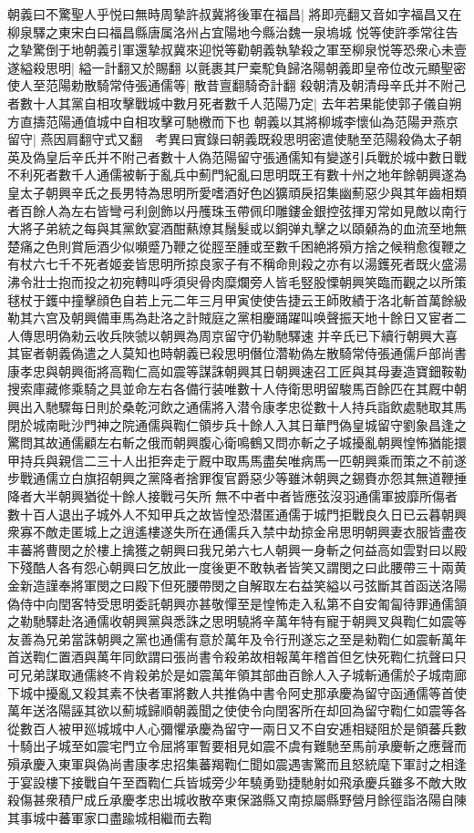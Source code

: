 朝義曰不驚聖人乎悦曰無時周摯許叔冀將後軍在福昌|{
	將即亮翻又音如字福昌又在柳泉驛之東宋白曰福昌縣唐属洛州占宜陽地今縣治魏一泉塢城}
悦等使許季常往告之摯驚倒于地朝義引軍還摯叔冀來迎悦等勸朝義執摯殺之軍至柳泉悦等恐衆心未壹遂縊殺思明|{
	縊一計翻又於賜翻}
以氈裹其尸槖駝負歸洛陽朝義即皇帝位改元顯聖密使人至范陽勅散騎常侍張通儒等|{
	散昔亶翻騎奇計翻}
殺朝清及朝清母辛氏并不附己者數十人其黨自相攻擊戰城中數月死者數千人范陽乃定|{
	去年若果能使郭子儀自朔方直擣范陽通值城中自相攻擊可馳檄而下也}
朝義以其將柳城李懷仙為范陽尹燕京留守|{
	燕因肩翻守式又翻　考異曰實錄曰朝義既殺思明密遣使馳至范陽殺偽太子朝英及偽皇后辛氏并不附己者數十人偽范陽留守張通儒知有變遂引兵戰於城中數日戰不利死者數千人通儒被斬于亂兵中薊門紀亂曰思明既王有數十州之地年餘朝興遂為皇太子朝興辛氏之長男特為思明所愛嗜酒好色凶獷頑戾招集幽薊惡少與其年齒相類者百餘人為左右皆彎弓利劍飾以丹雘珠玉帶佩印雕鏤金銀控弦揮刃常如見敵以南行大將子弟統之每與其黨飲宴酒酣爇燎其鬚髮或以銅弹丸擊之以頤顙為的血流至地無楚痛之色則賞巵酒少似嚬蹙乃鞭之從脛至腫或至數千困絶將殞方捨之候稍愈復鞭之有杖六七千不死者姬妾皆思明所掠良家子有不稱命則殺之亦有以湯鑊死者既火盛湯沸令壯士抱而投之初宛轉叫呼須臾骨肉糜爛旁人皆毛竪股慄朝興笑臨而觀之以所策毬杖于鑊中撞擊顔色自若上元二年三月甲寅使使告捷云王師敗績于洛北斬首萬餘級勒其六宫及朝興備車馬為赴洛之計賊庭之黨相慶踊躍叫唤聲振天地十餘日又宦者二人傳思明偽勑云收兵陜虢以朝興為周京留守仍勒馳驛速并辛氏已下續行朝興大喜其宦者朝義偽遣之人莫知也時朝義已殺思明僭位濳勒偽左散騎常侍張通儒戶部尚書康孝忠與朝興衙將高鞫仁高如震等謀誅朝興其日朝興速召工匠與其母妻造寶鈿鞍勒搜索庫藏修乘騎之具並命左右各備行装唯數十人侍衛思明留駿馬百餘匹在其厩中朝興出入馳驟每日則於桑乾河飲之通儒將入潜令康孝忠從數十人持兵詣飲處馳取其馬閉於城南毗沙門神之院通儒與鞫仁領步兵十餘人入其日華門偽皇城留守劉象昌逢之驚問其故通儒顧左右斬之俄而朝興腹心衛鳴鶴又問亦斬之子城擾亂朝興惶怖猶能擐甲持兵與親信二三十人出拒奔走亍厩中取馬馬盡矣唯病馬一匹朝興乘而策之不前遂步戰通儒立白旗招朝興之黨降者捨罪復官爵惡少等雖沐朝興之錫賚亦怨其無道鞭捶降者大半朝興猶從十餘人接戰弓矢所無不中者中者皆應弦沒羽通儒軍披靡所傷者數十百人退出子城外人不知甲兵之故皆惶恐潜匿通儒于城門拒戰良久日已云暮朝興衆寡不敵走匿城上之逍遙樓遂失所在通儒兵入禁中劫掠金帛思明朝興妻衣服皆盡夜丰蕃將曹閔之於樓上擒獲之朝興曰我兄弟六七人朝興一身斬之何益高如雲對曰以殿下殘酷人各有怨心朝興曰乞放此一度後更不敢執者皆笑又謂閔之曰此腰帶三十兩黄金新造謹奉將軍閔之曰殿下但死腰帶閔之自解取左右益笑縊以弓弦斷其首函送洛陽偽侍中向閏客特受思明委託朝興亦甚敬憚至是惶怖走入私第不自安匍匐待罪通儒頷之勒馳驛赴洛通儒收朝興黨與悉誅之思明驍將辛萬年特有寵于朝興叉與鞫仁如震等友善為兄弟當誅朝興之黨也通儒有意於萬年及令行刑遂忘之至是勑鞫仁如震斬萬年首送鞫仁置酒與萬年同飲謂曰張尚書令殺弟故相報萬年稽首但乞快死鞫仁抗聲曰只可兄弟謀取通儒終不肯殺弟於是如震萬年領其部曲百餘人入子城斬通儒於子城南廊下城中擾亂又殺其素不快者軍將數人共推偽中書令阿史那承慶為留守函通儒等首使萬年送洛陽誣其欲以薊城歸順朝義聞之使使令向閏客所在却回為留守鞫仁如震等各從數百人被甲廵城城中人心彌懼承慶為留守一兩日又不自安逓相疑阻於是領蕃兵數十騎出子城至如震宅門立令屈將軍暫要相見如震不虞有難馳至馬前承慶斬之應聲而殞承慶入東軍與偽尚書康孝忠招集蕃羯鞫仁聞如震遇害驚而且怒統麾下軍討之相逢于宴設樓下接戰自午至酉鞫仁兵皆城旁少年驍勇勁捷馳射如飛承慶兵雖多不敵大敗殺傷甚衆積尸成丘承慶孝忠出城收散卒東保潞縣又南掠屬縣野營月餘徑詣洛陽自陳其事城中蕃軍家口盡踰城相繼而去鞫}
